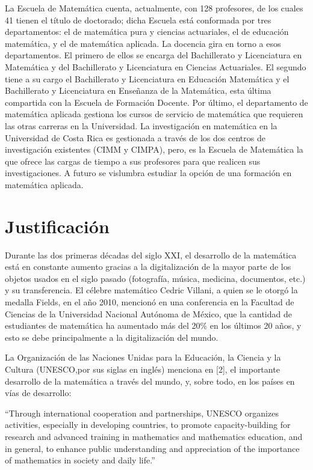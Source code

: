 La Escuela de Matemática cuenta, actualmente, con 128 profesores, de los cuales 41 tienen el título de doctorado; dicha Escuela está conformada por tres departamentos: el de matemática pura y ciencias actuariales, el de educación matemática, y el de matemática aplicada. La docencia gira en torno a esos departamentos. El primero de ellos se encarga del Bachillerato y Licenciatura en Matemática y del Bachillerato y Licenciatura en Ciencias Actuariales. El segundo tiene a su cargo el Bachillerato y Licenciatura en Educación Matemática y el Bachillerato y Licenciatura en Enseñanza de la Matemática, esta última compartida con la Escuela de Formación Docente. Por último, el departamento de matemática aplicada gestiona los cursos de servicio de matemática que requieren las otras carreras en la Universidad. La investigación en matemática en la Universidad de Costa Rica es gestionada a través de los dos centros de investigación existentes (CIMM y CIMPA), pero, es la Escuela de Matemática la que ofrece las cargas de tiempo a sus profesores para que realicen sus investigaciones. A futuro se vislumbra estudiar la opción de una formación en matemática aplicada.

\section{Justificación}

Durante las dos primeras décadas del siglo XXI, el desarrollo de la matemática está en constante aumento gracias a la digitalización de la mayor parte de los objetos usados en el siglo pasado (fotografía, música, medicina, documentos, etc.) y su transferencia.  El célebre matemático Cedric Villani, a quien se le otorgó la medalla Fields, en el año 2010, mencionó en una conferencia en la Facultad de Ciencias de la Universidad Nacional Autónoma de México, que la cantidad de estudiantes de matemática ha aumentado más del 20\% en los últimos 20 años, y esto se debe principalmente a la digitalización del mundo. 

    La Organización de las Naciones Unidas para la Educación, la Ciencia y la Cultura (UNESCO,por sus siglas en inglés) menciona en [2], el importante desarrollo de la matemática a través del mundo, y, sobre todo, en los países en vías de desarrollo:
    
    “Through international cooperation and partnerships, UNESCO organizes activities, especially in developing countries, to promote capacity-building for research and advanced training in mathematics and mathematics education, and in general, to enhance public understanding and appreciation of the importance of mathematics in society and daily life.”

